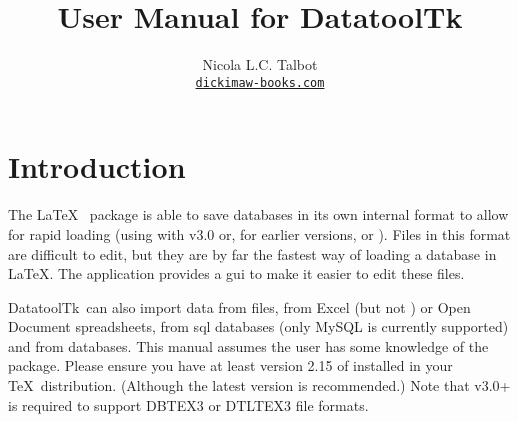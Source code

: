 
\usepackage{fontspec}
\setmainfont{Linux Libertine O}
\usepackage{verbatim}
\usepackage
 [
    novref,
 ]{texjavahelp}

\hypersetup{colorlinks,linkcolor=blue}


\newcommand{\actionoptval}[2]{\actionopt{#1}\dequals #2}
\newcommand{\actionoptvalm}[2]{\actionopt{#1}\dequals \marg{#2}}

\newcommand{\appname}{DatatoolTk}

\title{User Manual for \appname}
\author{Nicola L.C. Talbot\\\href{https://www.dickimaw-books.com/}{\nolinkurl{dickimaw-books.com}}}


\GlsXtrLoadResources[src={datatooltk,\langbibsrcs},
 \TeXJavaHelpSymbolResourceOptions
]

\GlsXtrLoadResources[src={datatooltk,\langbibsrcs},
 \TeXJavaHelpGlsResourceOptions
]


\maketitle
\frontmatter
\tableofcontents
\listoffigures

\mainmatter
\chapter{Introduction}
\label{sec:introduction}

The \LaTeX\  package is able to save databases in its
own internal format to allow for rapid loading (using
 with
 v3.0 or, for earlier versions,
 or
).  Files in this
 format are difficult to edit, but they are by far the
fastest way of loading a  \gls{database} in \LaTeX.
The  application provides a \gls{gui} to make it
easier to edit these files. 

\appname\ can also import data from  files, from Excel
 (but not ) or Open Document 
spreadsheets, from \gls{sql} databases (only MySQL is currently
supported) and from  databases.  This manual assumes
the user has some knowledge of the  package. Please
ensure you have at least version 2.15 of  installed in
your \TeX\ distribution.  (Although the latest version is
recommended.) Note that  v3.0+ is required to support 
\gls{DBTEX3} or \gls{DTLTEX3} file formats.

